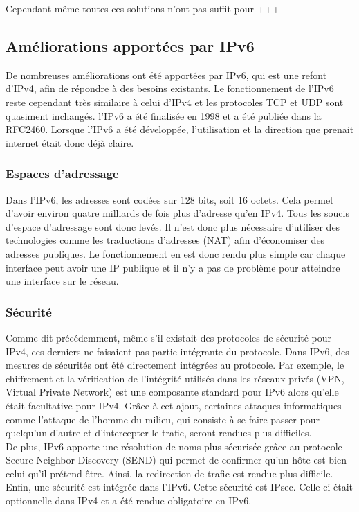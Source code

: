 Cependant même toutes ces solutions n'ont pas suffit pour +++

\subsection{Améliorations apportées par IPv6}

De nombreuses améliorations ont été apportées par IPv6, qui est une refont d'IPv4, afin de répondre à des besoins existants. Le fonctionnement de l'IPv6 reste cependant très similaire à celui d'IPv4 et 
les protocoles TCP et UDP sont quasiment inchangés.
l'IPv6 a été finalisée en 1998 et a été publiée dans la RFC2460. Lorsque l'IPv6 a été développée, 
l'utilisation et la direction que prenait internet était donc déjà claire. 

\subsubsection{Espaces d'adressage}
Dans l'IPv6, les adresses sont codées sur 128 bits, soit 16 octets. Cela permet d'avoir 
environ quatre milliards de fois plus d'adresse qu'en IPv4. Tous les soucis d'espace d'adressage sont donc levés. Il n'est donc plus nécessaire d'utiliser des technologies comme les traductions d'adresses
(NAT) afin d'économiser des adresses publiques. Le fonctionnement en est donc rendu plus simple car 
chaque interface peut avoir une IP publique et il n'y a pas de problème pour atteindre une interface sur le réseau.
\subsubsection{Sécurité}
Comme dit précédemment, même s'il existait des protocoles de sécurité pour IPv4, 
ces derniers ne faisaient pas partie intégrante du protocole.
Dans IPv6, des mesures de sécurités ont été directement intégrées au protocole.
Par exemple, le chiffrement et la vérification de l'intégrité utilisés dans les réseaux privés 
(VPN, Virtual Private Network) est une composante standard pour IPv6 alors qu'elle était 
facultative pour IPv4. Grâce à cet ajout, certaines attaques informatiques comme l'attaque de 
l'homme du milieu, qui consiste à se faire passer pour quelqu'un d'autre et d'intercepter 
le trafic, seront rendues plus difficiles.
\\
De plus, IPv6 apporte une résolution de noms plus sécurisée grâce au protocole Secure Neighbor
Discovery (SEND) qui permet de confirmer qu'un hôte est bien celui qu'il prétend être. Ainsi, la redirection de trafic est rendue plus difficile.
\\
Enfin, une sécurité est intégrée dans l'IPv6. Cette sécurité est IPsec. Celle-ci était optionnelle 
dans IPv4 et a été rendue obligatoire en IPv6.
